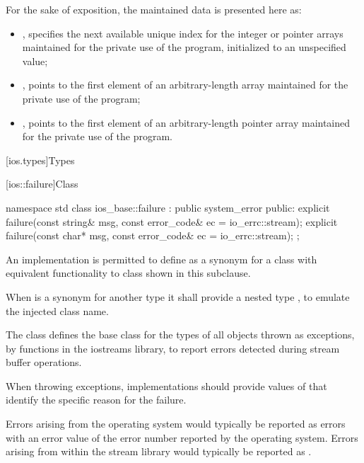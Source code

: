 \pnum
\begin{note}
For the sake of exposition, the maintained data is presented here as:
\begin{itemize}
\item
{},
specifies the next available
unique index for the integer or pointer arrays maintained for the private use
of the program, initialized to an unspecified value;
\item
{},
points to the first element of an
arbitrary-length
array maintained for the private use of the
program;
\item
{},
points to the first element of an
arbitrary-length pointer array maintained for the private use of the program.
\end{itemize}
\end{note}

[ios.types]{Types}

[ios::failure]{Class }

%
%
\begin{codeblock}
namespace std {
  class ios_base::failure : public system_error {
  public:
    explicit failure(const string& msg, const error_code& ec = io_errc::stream);
    explicit failure(const char* msg, const error_code& ec = io_errc::stream);
  };
}
\end{codeblock}

\pnum
An implementation is permitted to define 
as a synonym for a class with equivalent functionality
to class  shown in this subclause.
\begin{note}
When  is a synonym for another type
it shall provide a nested type ,
to emulate the injected class name.
\end{note}
The class
defines the base class
for the types of all objects thrown as exceptions,
by functions in the iostreams library,
to report errors detected during stream buffer operations.

\pnum
When throwing  exceptions, implementations should provide
values of  that identify the specific reason for the failure. \begin{note}
Errors arising from the operating system would typically be reported as
 errors with an error value of the error number
reported by the operating system. Errors arising from within the stream library would
typically be reported as . \end{note}


